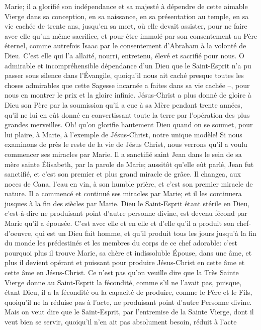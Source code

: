 Marie; il a glorifié son indépendance et sa majesté à dépendre de cette aimable Vierge dans sa conception, en sa
naissance, en sa présentation au temple, en sa vie cachée de trente ans, jusqu'en sa mort, où elle devait assister,
pour ne faire avec elle qu'un même sacrifice, et pour être immolé par son consentement au Père éternel, comme
autrefois Isaac par le consentement d'Abraham à la volonté de Dieu. C'est elle qui l'a allaité, nourri, entretenu,
élevé et sacrifié pour nous.
O admirable et incompréhensible dépendance d'un Dieu que le Saint-Esprit n'a pu passer sous silence dans
l'Évangile, quoiqu'il nous ait caché presque toutes les choses admirables que cette Sagesse incarnée a faites dans
sa vie cachée --, pour nous en montrer le prix et la gloire infinie. Jésus-Christ a plus donné de gloire à Dieu son
Père par la soumission qu'il a eue à sa Mère pendant trente années, qu'il ne lui en eût donné en convertissant
toute la terre par l'opération des plus grandes merveilles. Oh! qu'on glorifie hautement Dieu quand on se soumet,
pour lui plaire, à Marie, à l'exemple de Jésus-Christ, notre unique modèle!
 Si nous examinons de près le reste de la vie de Jésus Christ, nous verrons qu'il a voulu commencer ses
miracles par Marie. Il a sanctifié saint Jean dans le sein de sa mère sainte Élisabeth, par la parole de Marie;
aussitôt qu'elle eût parlé, Jean fut sanctifié, et c'est son premier et plus grand miracle de grâce. Il changea, aux
noces de Cana, l'eau en vin, à son humble prière, et c'est son premier miracle de nature. Il a commencé et
continué ses miracles par Marie; et il les continuera jusques à la fin des siècles par Marie.
 Dieu le Saint-Esprit étant stérile en Dieu, c'est-à-dire ne produisant point d'autre personne divine, est devenu
fécond par Marie qu'il a épousée. C'est avec elle et en elle et d'elle qu'il a produit son chef-d'oeuvre, qui est un
Dieu fait homme, et qu'il produit tous les jours jusqu'à la fin du monde les prédestinés et les membres du corps de
ce chef adorable: c'est pourquoi plus il trouve Marie, sa chère et indissoluble Épouse, dans une âme, et plus il
devient opérant et puissant pour produire Jésus-Christ en cette âme et cette âme en Jésus-Christ.
 Ce n'est pas qu'on veuille dire que la Très Sainte Vierge donne au Saint-Esprit la fécondité, comme s'il ne
l'avait pas, puisque, étant Dieu, il a la fécondité ou la capacité de produire, comme le Père et le Fils, quoiqu'il ne la
réduise pas à l'acte, ne produisant point d'autre Personne divine. Mais on veut dire que le Saint-Esprit, par
l'entremise de la Sainte Vierge, dont il veut bien se servir, quoiqu'il n'en ait pas absolument besoin, réduit à l'acte
